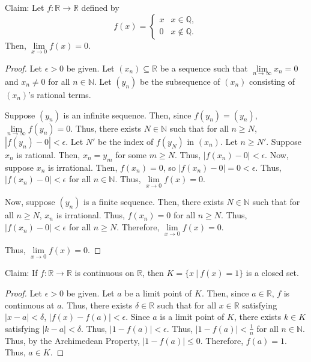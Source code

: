 \documentclass[12pt]{article}
\begin{document}
\newpage
{} Claim: Let $f: \mathbb R \to \mathbb R$ defined by \[f(x) = \begin{cases} x & x \in \mathbb Q, \\ 0 & x \notin \mathbb Q. \end{cases}\] Then, $\lim\limits_{x \to 0}f(x) = 0$.
\begin{proof}
    Let $\epsilon > 0$ be given.
    Let $(x_n) \subseteq \mathbb R$ be a sequence such that $\lim\limits_{n \to \infty} x_n = 0$ and $x_n \neq 0$ for all $n \in \mathbb N$.
    Let $(y_n)$ be the subsequence of $(x_n)$ consisting of $(x_n)$'s rational terms.

    Suppose $(y_n)$ is an infinite sequence.
        Then, since $f(y_n) = (y_n)$, $\lim\limits_{n \to \infty} f(y_n) = 0$.
        Thus, there exists $N \in \mathbb N$ such that for all $n \geq N$, $|f(y_n) - 0| < \epsilon$.
        Let $N'$ be the index of $f(y_N)$ in $(x_n)$.
        Let $n \geq N'$.
        Suppose $x_n$ is rational.
            Then, $x_n = y_m$ for some $m \geq N$.
            Thus, $|f(x_n) - 0| < \epsilon$.
        Now, suppose $x_n$ is irrational.
            Then, $f(x_n) = 0$, so $|f(x_n) - 0| = 0 < \epsilon$.
        Thus, $|f(x_n) - 0| < \epsilon$ for all $n \in \mathbb N$.
        Thus, $\lim\limits_{x \to 0} f(x) = 0$.

    Now, suppose $(y_n)$ is a finite sequence.
        Then, there exists $N \in \mathbb N$ such that for all $n \geq N$, $x_n$ is irrational.
        Thus, $f(x_n) = 0$ for all $n \geq N$.
        Thus, $|f(x_n) - 0| < \epsilon$ for all $n \geq N$.
        Therefore, $\lim\limits_{x \to 0} f(x) = 0$.

    Thus, $\lim\limits_{x \to 0} f(x) = 0$.
\end{proof}

\newpage
{} Claim: If $f: \mathbb R \to \mathbb R$ is continuous on $\mathbb R$, then $K = \{x~|~f(x)=1\}$ is a closed set.
\begin{proof}
    Let $\epsilon > 0$ be given.
    Let $a$ be a limit point of $K$.
    Then, since $a \in \mathbb R$, $f$ is continuous at $a$.
    Thus, there exists $\delta \in \mathbb R$ such that for all $x \in \mathbb R$ satisfying $|x - a| < \delta$, $|f(x) - f(a)| < \epsilon$.
    Since $a$ is a limit point of $K$, there exists $k \in K$ satisfying $|k - a| < \delta$.
    Thus, $|1 - f(a)| < \epsilon$.
    Thus, $|1 - f(a)| < \frac1n$ for all $n \in \mathbb N$.
    Thus, by the Archimedean Property, $|1 - f(a)| \leq 0$.
    Therefore, $f(a) = 1$.
    Thus, $a \in K$.
\end{proof}
\end{document}
